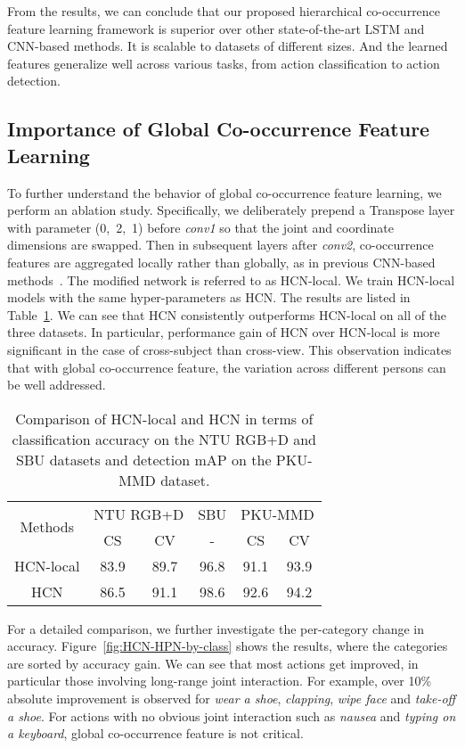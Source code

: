 \documentclass{article}
\begin{document}
From the results, we can conclude that our proposed hierarchical co-occurrence feature learning framework is superior over other state-of-the-art LSTM and CNN-based methods. It is scalable to datasets of different sizes. And the learned features generalize well across various tasks, from action classification to action detection.

\subsection{Importance of Global Co-occurrence Feature Learning}

To further understand the behavior of global co-occurrence feature learning, we perform an ablation study. Specifically, we deliberately prepend a Transpose layer with parameter (0,~2,~1) before \emph{conv1} so that the joint and coordinate dimensions are swapped. Then in subsequent layers after \emph{conv2}, co-occurrence features are aggregated locally rather than globally, as in previous CNN-based methods~\cite{Du2016Skeleton,Ke_2017_CVPR,Li_2017_ICMEW}. The modified network is referred to as HCN-local. We train HCN-local models with the same hyper-parameters as HCN. The results are listed in Table~\ref{table:HPN_HCN}. We can see that HCN consistently outperforms HCN-local on all of the three datasets. In particular, performance gain of HCN over HCN-local is more significant in the case of cross-subject than cross-view. This observation indicates that with global co-occurrence feature, the variation across different persons can be well addressed.

\begin{table}[htbp]
  \centering
  \begin{tabular}{c|cc|c|cc}\hline
    \multirow{2}{*}{Methods} & \multicolumn{2}{c|}{NTU RGB+D} & SBU & \multicolumn{2}{c}{PKU-MMD} \\
              & CS   & CV   & -    & CS   & CV   \\ \hline
    HCN-local & 83.9 & 89.7 & 96.8 & 91.1 & 93.9 \\
    HCN       & 86.5 & 91.1 & 98.6 & 92.6 & 94.2 \\
    \hline
  \end{tabular}
\caption{Comparison of HCN-local and HCN in terms of classification accuracy on the NTU RGB+D and SBU datasets and detection mAP on the PKU-MMD dataset.}
  \label{table:HPN_HCN}
\end{table}

For a detailed comparison, we further investigate the per-category change in accuracy. Figure~\ref{fig:HCN-HPN-by-class} shows the results, where the categories are sorted by accuracy gain. We can see that most actions get improved, in particular those involving long-range joint interaction. For example, over 10\% absolute improvement is observed for \emph{wear a shoe}, \emph{clapping}, \emph{wipe face} and \emph{take-off a shoe}. For actions with no obvious joint interaction such as \emph{nausea} and \emph{typing on a keyboard}, global co-occurrence feature is not critical.
\end{document}
